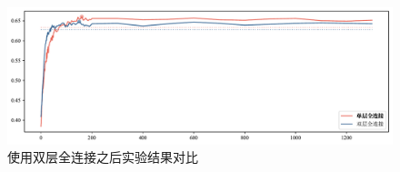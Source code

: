 \begin{figure}[htb]
	\centering
	\includegraphics[width=0.75\linewidth]{images/神经网络大小.pdf}
	\caption{使用双层全连接之后实验结果对比}
	\label{fig:size}
\end{figure}